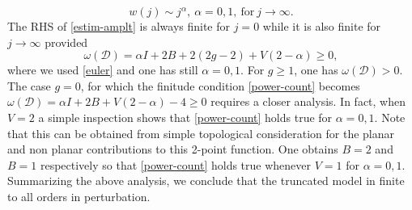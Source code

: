 \documentclass[11pt]{book}
\theoremstyle{break}
\begin{document}
\begin{equation}
w(j)\sim j^\alpha,\ \alpha=0,1,\ {\text{for}}\  j\to\infty.\label{alpha-values}
\end{equation}
The RHS of \eqref{estim-amplt} is always finite for $j=0$ while it is also finite for $j\to\infty$ provided%
\begin{equation}
\omega(\mathcal{D})=\alpha I+2B+2(2g-2)+V(2-\alpha)\ge0,\label{power-count}
\end{equation}
where we used \eqref{euler} and one has still $\alpha=0,1$. For $g\ge1$, one has $\omega(\mathcal{D})>0$. The case $g=0$, for which the finitude condition \eqref{power-count} becomes $\omega(\mathcal{D})=\alpha I+2B+V(2-\alpha)-4\ge0$ requires a closer analysis. In fact, when $V=2$ a simple inspection shows that \eqref{power-count} holds true for $\alpha=0,1$. Note that this can be obtained from simple topological consideration for the planar and non planar contributions to this 2-point function. One obtains $B=2$ and $B=1$ respectively so that \eqref{power-count} holds true whenever $V=1$ for $\alpha=0,1$. Summarizing the above analysis, we conclude that the truncated model in finite to all orders in perturbation.\par
\end{document}

